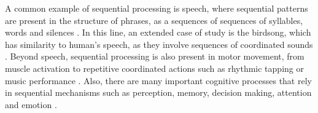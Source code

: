 





 A common example of sequential  processing is speech, where sequential patterns are present in the structure of phrases, as a sequences of sequences of syllables, words and silences \parencite{kiebel_recognizing_2009}. In this line, an extended case of study is the birdsong, which has  similarity to human's speech, as they involve sequences of coordinated sounds \parencite{prather_brains_2017,fishbein_sound_2019}. Beyond speech, sequential processing is also present in motor movement, from muscle activation to repetitive coordinated actions such as rhythmic tapping or music performance \parencite{ding_temporal_2017}. Also, there are many important cognitive processes that rely in sequential mechanisms such as perception, memory, decision making, attention and emotion \parencite{Varona2016, he_robust_2018, rabinovich_sequential_2020}.

